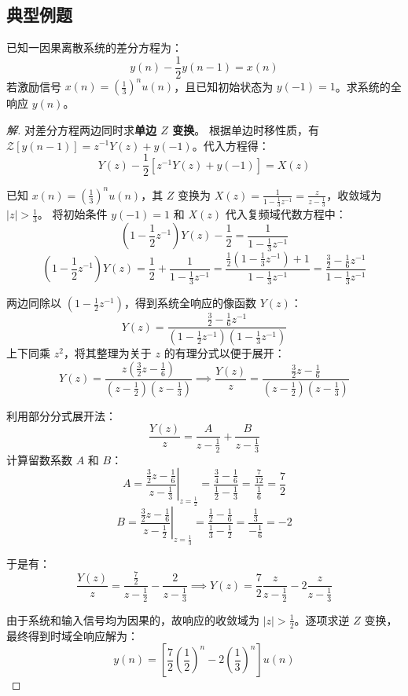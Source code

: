 \subsection{典型例题}
\begin{tcolorbox}[colback=orange!5!white, colframe=orange!75!black, title=例题 \thechapter.1]
	已知一因果离散系统的差分方程为：
	$$ y(n) - \frac{1}{2}y(n-1) = x(n) $$
	若激励信号 $x(n) = \left(\frac{1}{3}\right)^n u(n)$，且已知初始状态为 $y(-1) = 1$。求系统的全响应 $y(n)$。
\end{tcolorbox}
\begin{proof}[解]
	对差分方程两边同时求\textbf{单边 $Z$ 变换}。
	根据单边时移性质，有 $\mathcal{Z}[y(n-1)] = z^{-1}Y(z) + y(-1)$。代入方程得：
	$$ Y(z) - \frac{1}{2}\left[ z^{-1}Y(z) + y(-1) \right] = X(z) $$
	
	已知 $x(n) = \left(\frac{1}{3}\right)^n u(n)$，其 $Z$ 变换为 $X(z) = \frac{1}{1 - \frac{1}{3}z^{-1}} = \frac{z}{z - \frac{1}{3}}$，收敛域为 $|z| > \frac{1}{3}$。
	将初始条件 $y(-1) = 1$ 和 $X(z)$ 代入复频域代数方程中：
	$$ \left(1 - \frac{1}{2}z^{-1}\right)Y(z) - \frac{1}{2} = \frac{1}{1 - \frac{1}{3}z^{-1}} $$
	$$ \left(1 - \frac{1}{2}z^{-1}\right)Y(z) = \frac{1}{2} + \frac{1}{1 - \frac{1}{3}z^{-1}} = \frac{\frac{1}{2}\left(1 - \frac{1}{3}z^{-1}\right) + 1}{1 - \frac{1}{3}z^{-1}} = \frac{\frac{3}{2} - \frac{1}{6}z^{-1}}{1 - \frac{1}{3}z^{-1}} $$
	
	两边同除以 $\left(1 - \frac{1}{2}z^{-1}\right)$，得到系统全响应的像函数 $Y(z)$：
	$$ Y(z) = \frac{\frac{3}{2} - \frac{1}{6}z^{-1}}{\left(1 - \frac{1}{2}z^{-1}\right)\left(1 - \frac{1}{3}z^{-1}\right)} $$
	上下同乘 $z^2$，将其整理为关于 $z$ 的有理分式以便于展开：
	$$ Y(z) = \frac{z\left(\frac{3}{2}z - \frac{1}{6}\right)}{\left(z - \frac{1}{2}\right)\left(z - \frac{1}{3}\right)} \implies \frac{Y(z)}{z} = \frac{\frac{3}{2}z - \frac{1}{6}}{\left(z - \frac{1}{2}\right)\left(z - \frac{1}{3}\right)} $$
	
	利用部分分式展开法：
	$$ \frac{Y(z)}{z} = \frac{A}{z - \frac{1}{2}} + \frac{B}{z - \frac{1}{3}} $$
	计算留数系数 $A$ 和 $B$：
	$$ A = \left. \frac{\frac{3}{2}z - \frac{1}{6}}{z - \frac{1}{3}} \right|_{z=\frac{1}{2}} = \frac{\frac{3}{4} - \frac{1}{6}}{\frac{1}{2} - \frac{1}{3}} = \frac{\frac{7}{12}}{\frac{1}{6}} = \frac{7}{2} $$
	$$ B = \left. \frac{\frac{3}{2}z - \frac{1}{6}}{z - \frac{1}{2}} \right|_{z=\frac{1}{3}} = \frac{\frac{1}{2} - \frac{1}{6}}{\frac{1}{3} - \frac{1}{2}} = \frac{\frac{1}{3}}{-\frac{1}{6}} = -2 $$
	
	于是有：
	$$ \frac{Y(z)}{z} = \frac{\frac{7}{2}}{z - \frac{1}{2}} - \frac{2}{z - \frac{1}{3}} \implies Y(z) = \frac{7}{2}\frac{z}{z - \frac{1}{2}} - 2\frac{z}{z - \frac{1}{3}} $$
	
	由于系统和输入信号均为因果的，故响应的收敛域为 $|z| > \frac{1}{2}$。逐项求逆 $Z$ 变换，最终得到时域全响应解为：
	$$ y(n) = \left[ \frac{7}{2}\left(\frac{1}{2}\right)^n - 2\left(\frac{1}{3}\right)^n \right] u(n) $$
\end{proof}
